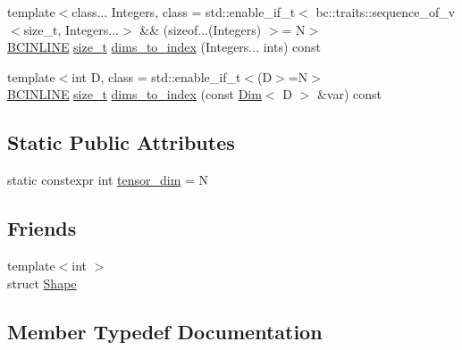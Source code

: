 \begin{DoxyCompactItemize}
\item 
{\footnotesize template$<$class... Integers, class  = std\+::enable\+\_\+if\+\_\+t$<$			bc\+::traits\+::sequence\+\_\+of\+\_\+v$<$size\+\_\+t, Integers...$>$ \&\&			(sizeof...(\+Integers) $>$= N$>$ }\\\hyperlink{common_8h_a6699e8b0449da5c0fafb878e59c1d4b1}{B\+C\+I\+N\+L\+I\+NE} \hyperlink{structbc_1_1Shape_a63f974ebdb0e3755ef3140b17abcf235}{size\+\_\+t} \hyperlink{structbc_1_1Shape_a84e2316eaa358ff0fa23987623057c3f}{dims\+\_\+to\+\_\+index} (Integers... ints) const
\item 
{\footnotesize template$<$int D, class  = std\+::enable\+\_\+if\+\_\+t$<$(\+D$>$=N$>$ }\\\hyperlink{common_8h_a6699e8b0449da5c0fafb878e59c1d4b1}{B\+C\+I\+N\+L\+I\+NE} \hyperlink{structbc_1_1Shape_a63f974ebdb0e3755ef3140b17abcf235}{size\+\_\+t} \hyperlink{structbc_1_1Shape_a13997bdb38b401a797f411d8630895e7}{dims\+\_\+to\+\_\+index} (const \hyperlink{structbc_1_1Dim}{Dim}$<$ D $>$ \&var) const
\end{DoxyCompactItemize}
\subsection*{Static Public Attributes}
\begin{DoxyCompactItemize}
\item 
static constexpr int \hyperlink{structbc_1_1Shape_a1f75fffa8b4aec4405025de308adb169}{tensor\+\_\+dim} = N
\end{DoxyCompactItemize}
\subsection*{Friends}
\begin{DoxyCompactItemize}
\item 
{\footnotesize template$<$int $>$ }\\struct \hyperlink{structbc_1_1Shape_ab0bde87b11c5c08fec2f2325317820de}{Shape}
\end{DoxyCompactItemize}


\subsection{Member Typedef Documentation}
\mbox{\label{structbc_1_1Shape_a63f974ebdb0e3755ef3140b17abcf235}} 
